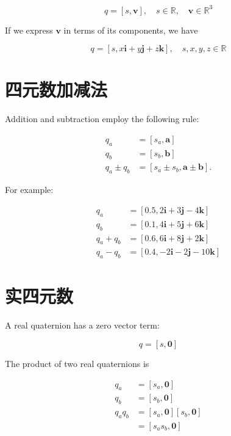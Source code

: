 $$
    q=[s, \mathbf{v}], \quad s \in \mathbb{R}, \quad \mathbf{v} \in \mathbb{R}^{3}
$$

If we express $\mathbf{v}$ in terms of its components, we have

$$
    q=[s, x \mathbf{i}+y \mathbf{j}+z \mathbf{k}], \quad s, x, y, z \in \mathbb{R}
$$

\section{四元数加减法}
Addition and subtraction employ the following rule:

$$
    \begin{aligned}
        q_{a}           & =\left[s_{a}, \mathbf{a}\right]                            \\
        q_{b}           & =\left[s_{b}, \mathbf{b}\right]                            \\
        q_{a} \pm q_{b} & =\left[s_{a} \pm s_{b}, \mathbf{a} \pm \mathbf{b}\right] .
    \end{aligned}
$$

For example:

$$
    \begin{aligned}
        q_{a}       & =[0.5,2 \mathbf{i}+3 \mathbf{j}-4 \mathbf{k}]   \\
        q_{b}       & =[0.1,4 \mathbf{i}+5 \mathbf{j}+6 \mathbf{k}]   \\
        q_{a}+q_{b} & =[0.6,6 \mathbf{i}+8 \mathbf{j}+2 \mathbf{k}]   \\
        q_{a}-q_{b} & =[0.4,-2 \mathbf{i}-2 \mathbf{j}-10 \mathbf{k}]
    \end{aligned}
$$

\section{实四元数}
A real quaternion has a zero vector term:

$$
    q=[s, \mathbf{0}]
$$

The product of two real quaternions is

$$
    \begin{aligned}
        q_{a}       & =\left[s_{a}, \mathbf{0}\right]                               \\
        q_{b}       & =\left[s_{b}, \mathbf{0}\right]                               \\
        q_{a} q_{b} & =\left[s_{a}, \mathbf{0}\right]\left[s_{b}, \mathbf{0}\right] \\
                    & =\left[s_{a} s_{b}, \mathbf{0}\right]
    \end{aligned}
$$


